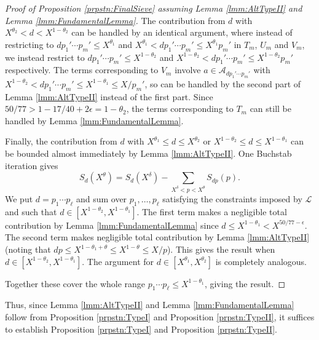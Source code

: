\documentclass[10pt]{amsart}
\theoremstyle{plain}
\numberwithin{sblmm}{thrm}
\numberwithin{equation}{section}
\begin{document}
\begin{proof}[Proof of Proposition \ref{prpstn:FinalSieve} assuming Lemma \ref{lmm:AltTypeII} and Lemma \ref{lmm:FundamentalLemma}]
The contribution from $d$ with $X^{\theta_2}< d< X^{1-\theta_2}$ can be handled by an identical argument, where instead of restricting to $d p_1'\cdots p_m'\le X^{\theta_1}$ and $X^{\theta_1}<d p_1'\cdots p_m'\le X^{\theta_1}p_m'$ in $T_m$, $U_m$ and $V_m$, we instead restrict to  $d p_1'\cdots p_m'\le X^{1-\theta_2}$ and $X^{1-\theta_2}<d p_1'\cdots p_m'\le X^{1-\theta_2}p_m'$ respectively. The terms corresponding to $V_m$ involve $a\in\mathcal{A}{}_{d p_1'\cdots p_m'}$ with $X^{1-\theta_2}<d p_1'\cdots p_m'\le X^{1-\theta_1}\le X/p_m'$, so can be handled by the second part of Lemma \ref{lmm:AltTypeII} instead of the first part. Since $50/77>1-17/40+2\epsilon=1-\theta_2$, the terms corresponding to $T_m$ can still be handled by Lemma \ref{lmm:FundamentalLemma}.

Finally, the contribution from $d$ with $X^{\theta_1}\le  d\le X^{\theta_2}$ or $X^{1-\theta_2}\le d\le X^{1-\theta_1}$ can be bounded almost immediately by Lemma \ref{lmm:AltTypeII}. One Buchstab iteration gives
\[
S_{d}(X^\theta)=S_d(X^\delta)-\sum_{X^\delta<p<X^\theta}S_{d p}(p).
\]
We put $d=p_1\cdots p_\ell$ and sum over $p_1,\dots,p_\ell$ satisfying the constraints imposed by $\mathcal{L}$ and such that $d\in [X^{1-\theta_2},X^{1-\theta_1}]$. The first term makes a negligible total contribution by Lemma \ref{lmm:FundamentalLemma} since $d\le X^{1-\theta_1}<X^{50/77-\epsilon}$. The second term makes negligible total contribution by Lemma \ref{lmm:AltTypeII} (noting that $d p\le X^{1-\theta_1+\theta}\le X^{1-\theta}\le X/p$). This gives the result when $d\in[X^{1-\theta_2}, X^{1-\theta_1}]$. The argument for $d\in [X^{\theta_1},X^{\theta_2}]$ is completely analogous. 

Together these cover the whole range $p_1\cdots p_\ell\le X^{1-\theta_1}$, giving the result.
%
%
\end{proof}
%
%
%
Thus, since Lemma \ref{lmm:AltTypeII} and Lemma \ref{lmm:FundamentalLemma} follow from Proposition \ref{prpstn:TypeI} and Proposition \ref{prpstn:TypeII}, it suffices to establish Proposition \ref{prpstn:TypeI} and Proposition \ref{prpstn:TypeII}.
%
%
%
%
%
%
%
%
%
%
\end{document}
